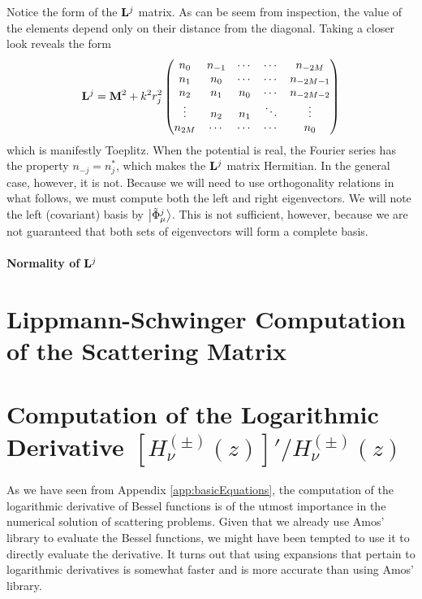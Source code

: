 Notice the form of the $\mathbf{L}^j$ matrix. As can be seem from inspection, 
the value of the elements depend only on their distance from the diagonal.
Taking a closer look reveals the form
  \begin{equation}
   \mathbf{L}^j = \mathbf{M}^2 +k^2r_j^2\begin{pmatrix} 
		  n_0 & n_{-1} & \cdots & \cdots & n_{-2M}	\\
		  n_1	  & n_0& \cdots & \cdots & n_{-2M-1}\\
		  n_2	  & n_1	   & n_0& \cdots & n_{-2M-2}\\
		  \vdots  & n_2    & n_1    & \ddots & \vdots   \\
		  n_{2M}  & \cdots & \cdots & \cdots & n_0
		\end{pmatrix}
  \end{equation}
which is manifestly Toeplitz. When the potential is real, the Fourier
series has the property $n_{-j}=n_j^*$, which makes the $\mathbf{L}^j$ 
matrix Hermitian. In the general case, however, it is not. Because
we will need to use orthogonality relations in what follows, we must
compute both the left and right eigenvectors. 
We will note the left (covariant) basis by $\Ket{\tilde{\Phi}_\mu^j}$.
This is not sufficient, however, because we are not guaranteed that
both sets of eigenvectors will form a complete basis. 

\paragraph{Normality of $\mathbf{L}^j$}

\section{Lippmann-Schwinger Computation of the Scattering Matrix}\label{sec:app.numTools.lippmannSchwinger}
\section{Computation of the Logarithmic Derivative $[H^{(\pm)}_\nu(z)]'/H^{(\pm)}_\nu(z)$}\label{sec:app.numTools.logDeriv}

As we have seen from Appendix \ref{app:basicEquations}, the computation of the logarithmic derivative
of Bessel functions is of the utmost importance in the numerical solution 
of scattering problems. Given that we already use Amos' library \cite{AMO86} to evaluate
the Bessel functions, we might have been tempted to use it 
to directly evaluate the derivative. It turns out that using
expansions that pertain to logarithmic derivatives is somewhat
faster and is more accurate than using Amos' library. 

